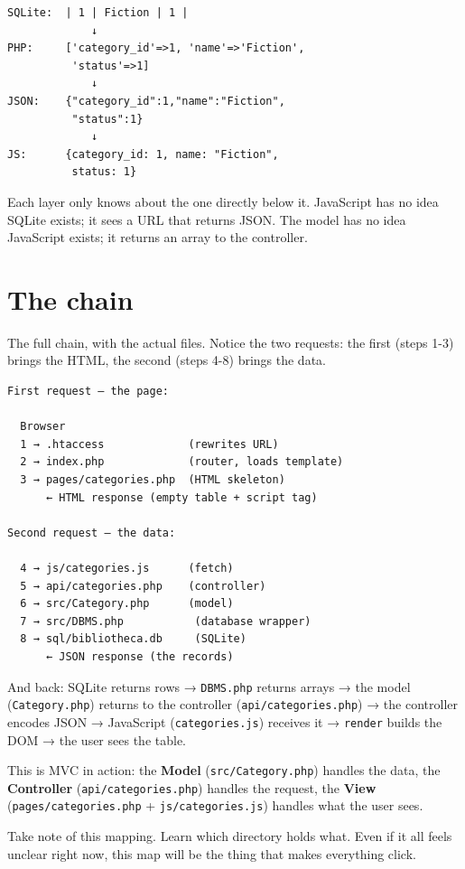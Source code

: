 \documentclass[11pt,a4paper,oneside]{book}
\begin{document}
\begin{verbatim}
SQLite:  | 1 | Fiction | 1 |
             ↓
PHP:     ['category_id'=>1, 'name'=>'Fiction',
          'status'=>1]
             ↓
JSON:    {"category_id":1,"name":"Fiction",
          "status":1}
             ↓
JS:      {category_id: 1, name: "Fiction",
          status: 1}
\end{verbatim}

Each layer only knows about the one directly below it. JavaScript
has no idea SQLite exists; it sees a URL that returns JSON. The
model has no idea JavaScript exists; it returns an array to the
controller.

\hypertarget{the-chain}{%
\section{The chain}\label{the-chain}}

The full chain, with the actual files. Notice the two requests:
the first (steps 1-3) brings the HTML, the second (steps 4-8)
brings the data.

\begin{verbatim}
First request — the page:

  Browser
  1 → .htaccess             (rewrites URL)
  2 → index.php             (router, loads template)
  3 → pages/categories.php  (HTML skeleton)
      ← HTML response (empty table + script tag)

Second request — the data:

  4 → js/categories.js      (fetch)
  5 → api/categories.php    (controller)
  6 → src/Category.php      (model)
  7 → src/DBMS.php           (database wrapper)
  8 → sql/bibliotheca.db     (SQLite)
      ← JSON response (the records)
\end{verbatim}

And back: SQLite returns rows → \texttt{DBMS.php} returns arrays
→ the model (\texttt{Category.php}) returns to the controller
(\texttt{api/categories.php}) → the controller encodes JSON →
JavaScript (\texttt{categories.js}) receives it → \texttt{render}
builds the DOM → the user sees the table.

This is MVC in action: the \textbf{Model}
(\texttt{src/Category.php}) handles the data, the
\textbf{Controller} (\texttt{api/categories.php}) handles the
request, the \textbf{View} (\texttt{pages/categories.php} +
\texttt{js/categories.js}) handles what the user sees.

Take note of this mapping. Learn which directory holds what. Even
if it all feels unclear right now, this map will be the thing
that makes everything click.
\end{document}
